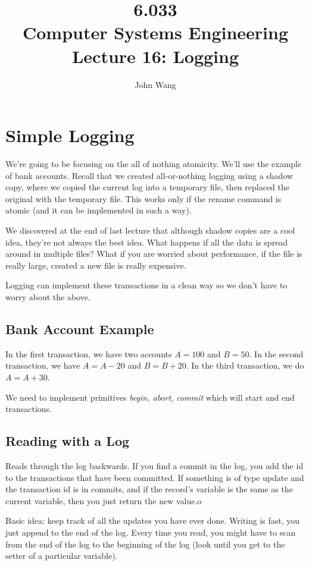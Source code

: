 \documentclass[psamsfonts]{amsart}
\title{6.033 \\
Computer Systems Engineering \\
Lecture 16: Logging}
\author{John Wang}
\begin{document}
\maketitle

\section{Simple Logging}

We're going to be focusing on the all of nothing atomicity. We'll use the example of bank accounts. Recall that we created all-or-nothing logging using a shadow copy, where we copied the current log into a temporary file, then replaced the original with the temporary file. This works only if the rename command is atomic (and it can be implemented in such a way).

We discovered at the end of last lecture that although shadow copies are a cool idea, they're not always the best idea. What happens if all the data is spread around in multiple files? What if you are worried about performance, if the file is really large, created a new file is really expensive.

Logging can implement these transactions in a clean way so we don't have to worry about the above.

\subsection{Bank Account Example}

In the first transaction, we have two accounts $A = 100$ and $B= 50$. In the second transaction, we have $A = A - 20$ and $B = B +20$. In the third transaction, we do $A = A + 30$.

We need to implement primitives \emph{begin, abort, commit} which will start and end transactions.

\subsection{Reading with a Log}

Reads through the log backwards. If you find a commit in the log, you add the id to the transactions that have been committed. If something is of type update and the transaction id is in commits, and if the record's variable is the same as the current variable, then you just return the new value.o

Basic idea: keep track of all the updates you have ever done. Writing is fast, you just append to the end of the log. Every time you read, you might have to scan from the end of the log to the beginning of the log (look until you get to the setter of a particular variable).
\end{document}
